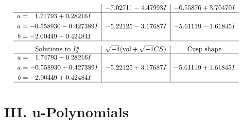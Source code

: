 \documentclass[1p]{elsarticle_modified}
\theoremstyle{definition}
\newcommand{\I}{\sqrt{-1}}
\begin{document}
$$\begin{array}{c|c|c}
 & -7.02711 - 4.47993 I & -0.55876 + 3.70470 I \\ \hline\begin{aligned}
u &= \phantom{-}1.74793 + 0.28216 I \\
a &= -0.558930 - 0.427389 I \\
b &= -2.00449 - 0.42484 I\end{aligned}
 & -5.22125 - 3.17687 I & -5.61119 - 1.61845 I\\
 \hline 
 \end{array}$$\newpage$$\begin{array}{c|c|c}  
\text{Solutions to }I^u_{2}& \I (\text{vol} + \sqrt{-1}CS) & \text{Cusp shape}\\
 \hline 
\begin{aligned}
u &= \phantom{-}1.74793 - 0.28216 I \\
a &= -0.558930 + 0.427389 I \\
b &= -2.00449 + 0.42484 I\end{aligned}
 & -5.22125 + 3.17687 I & -5.61119 + 1.61845 I\\
 \hline 
 \end{array}$$\newpage
\newpage\renewcommand{\arraystretch}{1}
\centering \section*{ III. u-Polynomials}
\end{document}
